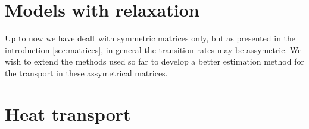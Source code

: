 
\section{Models with relaxation}




Up to now we have dealt with symmetric matrices only, but as presented in 
the introduction \autoref{sec:matrices}, in general the transition 
rates may be assymetric. We wish to extend the methods used so far to
develop a better estimation method for the transport in these assymetrical matrices.






\section{Heat transport}

\begin{comment}
Heat conduction by phonons is also affected by the localization properties
of the model. If disorder scatters normal modes and induces diffusive 
energy transport, followed by normal heat conduction, then in accordance to Fourier's law, 
the heat current $J$ depends inversely on the system size: $J\sim N^{-1}$. 
However, in recent studies \ref{who} it was shown that $J\sim N^{-\alpha}$ 
with $\alpha\ne 1$ is sometimes the case for disordered $1d$ harmonic chains.
We wish to investigate the validity of Fourier's law for quasi-$1d$ and 
higher dimensional disordered systems.
\end{comment}


